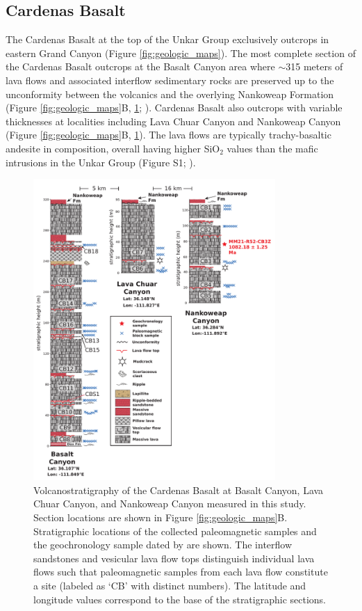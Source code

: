\subsection*{Cardenas Basalt}

The Cardenas Basalt at the top of the Unkar Group exclusively outcrops in eastern Grand Canyon (Figure \ref{fig:geologic_maps}). The most complete section of the Cardenas Basalt outcrops at the Basalt Canyon area where $\sim$315 meters of lava flows and associated interflow sedimentary rocks are preserved up to the unconformity between the volcanics and the overlying Nankoweap Formation (Figure \ref{fig:geologic_maps}B, \ref{fig:cardenas_strat}; \cite{Lucchitta1983a, Hendricks1989a}). Cardenas Basalt also outcrops with variable thicknesses at localities including Lava Chuar Canyon and Nankoweap Canyon (Figure \ref{fig:geologic_maps}B, \ref{fig:cardenas_strat}). The lava flows are typically trachy-basaltic andesite in composition, overall having higher SiO$_2$ values than the mafic intrusions in the Unkar Group (Figure S1; \cite{Hendricks1989a, Larson1994a}).

\begin{figure}[h!]
\centering
\includegraphics[width=0.82\textwidth]{figure/Zhang2024b/Cardenas_strat_uniform_scale.pdf}
\caption[Volcanostratigraphy of the Cardenas Basalt at Basalt Canyon, Lava Chuar Canyon, and Nankoweap Canyon]{Volcanostratigraphy of the Cardenas Basalt at Basalt Canyon, Lava Chuar Canyon, and Nankoweap Canyon measured in this study. Section locations are shown in Figure \ref{fig:geologic_maps}B. Stratigraphic locations of the collected paleomagnetic samples and the geochronology sample dated by \cite{Mohr2024a} are shown. The interflow sandstones and vesicular lava flow tops distinguish individual lava flows such that paleomagnetic samples from each lava flow constitute a site (labeled as `CB' with distinct numbers). The latitude and longitude values correspond to the base of the stratigraphic sections.}
\label{fig:cardenas_strat}
\end{figure}

